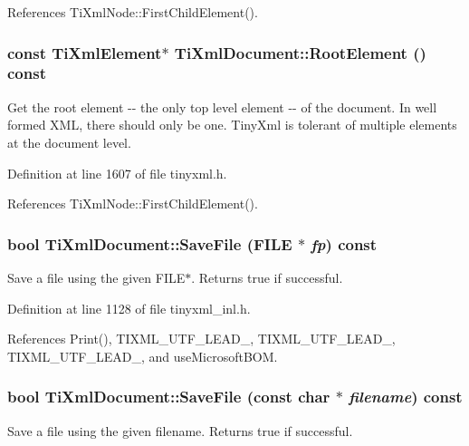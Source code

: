 References TiXmlNode::FirstChildElement().\hypertarget{class_ti_xml_document_ad09d17927f908f40efb406af2fb873be}{
\subsubsection[{RootElement}]{\setlength{\rightskip}{0pt plus 5cm}const {\bf TiXmlElement}$\ast$ TiXmlDocument::RootElement () const}}
\label{class_ti_xml_document_ad09d17927f908f40efb406af2fb873be}
Get the root element -\/-\/ the only top level element -\/-\/ of the document. In well formed XML, there should only be one. TinyXml is tolerant of multiple elements at the document level. 

Definition at line 1607 of file tinyxml.h.

References TiXmlNode::FirstChildElement().\hypertarget{class_ti_xml_document_acf1672b4538c6d1d441f9f108aea2bf4}{
\subsubsection[{SaveFile}]{\setlength{\rightskip}{0pt plus 5cm}bool TiXmlDocument::SaveFile (FILE $\ast$ {\em fp}) const}}
\label{class_ti_xml_document_acf1672b4538c6d1d441f9f108aea2bf4}


Save a file using the given FILE$\ast$. Returns true if successful. 

Definition at line 1128 of file tinyxml\_\-inl.h.

References Print(), TIXML\_\-UTF\_\-LEAD\_, TIXML\_\-UTF\_\-LEAD\_, TIXML\_\-UTF\_\-LEAD\_, and useMicrosoftBOM.\hypertarget{class_ti_xml_document_ae869f5ebf7fc54c4a1d737fb4689fd44}{
\subsubsection[{SaveFile}]{\setlength{\rightskip}{0pt plus 5cm}bool TiXmlDocument::SaveFile (const char $\ast$ {\em filename}) const}}
\label{class_ti_xml_document_ae869f5ebf7fc54c4a1d737fb4689fd44}


Save a file using the given filename. Returns true if successful. 

